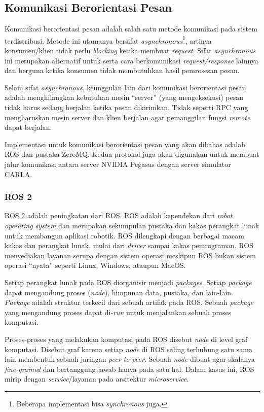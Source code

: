 \subsection{Komunikasi Berorientasi Pesan}

Komunikasi berorientasi pesan adalah salah satu metode komunikasi pada sistem
terdistribusi. Metode ini utamanya bersifat
\textit{asynchronous}\footnote{Beberapa implementasi bisa \textit{synchronous}
    juga.}, artinya konsumen/klien tidak perlu \textit{blocking} ketika membuat
\textit{request}. Sifat \textit{asynchronous} ini merupakan alternatif untuk
serta cara berkomunikasi \textit{request/response} lainnya dan berguna ketika
konsumen tidak membutuhkan hasil pemrosesan pesan.

Selain sifat \textit{asynchronous}, keunggulan lain dari komunikasi berorientasi
pesan ada\-lah menghilangkan kebutuhan mesin ``server'' (yang mengeksekusi) pesan
tidak harus sedang berjalan ketika pesan dikirimkan. Tidak seperti RPC yang
mengharuskan mesin server dan klien berjalan agar pemanggilan fungsi
\textit{remote} dapat berjalan.

Implementasi untuk komunikasi berorientasi pesan yang akan dibahas adalah ROS
dan pustaka ZeroMQ. Kedua protokol juga akan digunakan untuk membuat jalur
komunikasi antara server NVIDIA Pegasus dengan server simulator CARLA.

\subsubsection{ROS 2}

ROS 2 adalah peningkatan dari ROS. ROS adalah kependekan dari \textit{robot
    operating system} dan merupakan sekumpulan pustaka dan kakas perangkat lunak
untuk membangun aplikasi robotik. ROS dilengkapi dengan berbagai macam kakas
dan perangkat lunak, mulai dari \textit{driver} sampai kakas pemrograman. ROS
menyediakan layanan serupa dengan sistem operasi meskipun ROS bukan sistem
operasi ``nyata'' seperti Linux, Windows, ataupun MacOS.

Setiap perangkat lunak pada ROS diorganisir menjadi \textit{packages}. Setiap
\textit{package} dapat mengandung proses (\textit{node}), himpunan data,
pustaka, dan lain-lain. \textit{Package} adalah struktur terkecil dari sebuah
artifak pada ROS. Sebuah \textit{package} yang mengandung proses dapat
di-\textit{run} untuk menjalankan sebuah proses komputasi.

Proses-proses yang melakukan komputasi pada ROS disebut \textit{node} di level
graf komputasi. Disebut graf karena setiap \textit{node} di ROS saling terhubung
satu sama lain membentuk sebuah jaringan \textit{peer-to-peer}. Sebuah
\textit{node} dibuat agar skalanya \textit{fine-grained} dan bertanggung jawab
hanya pada satu hal. Dalam kasus ini, ROS mirip dengan \textit{service}/layanan
pada arsitektur \textit{microservice}.

